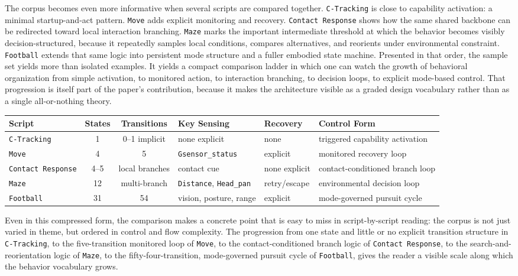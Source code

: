 \documentclass[11pt]{article}
\begin{document}
The corpus becomes even more informative when several scripts are compared together. \texttt{C-}\allowbreak\texttt{Tracking} is close to capability activation: a minimal startup-and-act pattern. \texttt{Move} adds explicit monitoring and recovery. \texttt{Contact Response} shows how the same shared backbone can be redirected toward local interaction branching. \texttt{Maze} marks the important intermediate threshold at which the behavior becomes visibly decision-structured, because it repeatedly samples local conditions, compares alternatives, and reorients under environmental constraint. \texttt{Football} extends that same logic into persistent mode structure and a fuller embodied state machine. Presented in that order, the sample set yields more than isolated examples. It yields a compact comparison ladder in which one can watch the growth of behavioral organization from simple activation, to monitored action, to interaction branching, to decision loops, to explicit mode-based control. That progression is itself part of the paper's contribution, because it makes the architecture visible as a graded design vocabulary rather than as a single all-or-nothing theory.

\begin{center}
\small
\setlength{\tabcolsep}{4pt}
\begin{tabularx}{\textwidth}{@{}lcc>{\raggedright\arraybackslash}X>{\raggedright\arraybackslash}X>{\raggedright\arraybackslash}X@{}}
\hline
Script & States & Transitions & Key Sensing & Recovery & Control Form \\
\hline
\texttt{C-Tracking} & 1 & 0--1 implicit & none explicit & none & triggered capability activation \\
\texttt{Move} & 4 & 5 & \texttt{Gsensor\_}\allowbreak\texttt{status} & explicit & monitored recovery loop \\
\texttt{Contact Response} & 4--5 & local branches & contact cue & none explicit & contact-conditioned branch loop \\
\texttt{Maze} & 12 & multi-branch & \texttt{Distance}, \texttt{Head\_pan} & retry/escape & environmental decision loop \\
\texttt{Football} & 31 & 54 & vision, posture, range & explicit & mode-governed pursuit cycle \\
\hline
\end{tabularx}
\end{center}

Even in this compressed form, the comparison makes a concrete point that is easy to miss in script-by-script reading: the corpus is not just varied in theme, but ordered in control and flow complexity. The progression from one state and little or no explicit transition structure in \texttt{C-Tracking}, to the five-transition monitored loop of \texttt{Move}, to the contact-conditioned branch logic of \texttt{Contact Response}, to the search-and-reorientation logic of \texttt{Maze}, to the fifty-four-transition, mode-governed pursuit cycle of \texttt{Football}, gives the reader a visible scale along which the behavior vocabulary grows.
\end{document}
